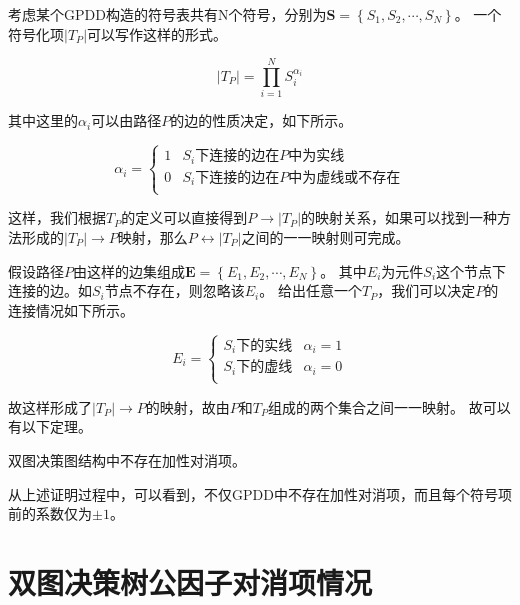 考虑某个GPDD构造的符号表共有N个符号，分别为${\mathbf{S}} = \left\{ {{S_1},{S_2}, \cdots ,{S_N}} \right\}$。
一个符号化项$\left|T_P\right|$可以写作这样的形式。

\begin{equation}
\left| {{T_P}} \right| = \prod\limits_{i = 1}^N {S_i^{{\alpha _i}}}
\end{equation}

其中这里的$\alpha _i$可以由路径$P$的边的性质决定，如下所示。

\begin{equation}
{\alpha _i} = \left\{ {
	\begin{array}{*{20}{c}}
	1 & {{S_i}{\text{下连接的边在}P\text{中为实线}}}  \\
	0 & {{S_i}{\text{下连接的边在}P\text{中为虚线或不存在}}}  \\
	\end{array} } \right.
\end{equation}

这样，我们根据$T_P$的定义可以直接得到$P \rightarrow \left|T_P\right|$的映射关系，如果可以找到一种方法形成的$\left|T_P\right| \rightarrow P$映射，那么$P \leftrightarrow \left|T_P\right|$之间的一一映射则可完成。

假设路径$P$由这样的边集组成${\mathbf{E}} = \left\{ {{E_1},{E_2}, \cdots ,{E_N}} \right\}$。
其中$E_i$为元件$S_i$这个节点下连接的边。如$S_i$节点不存在，则忽略该$E_i$。
给出任意一个$T_P$，我们可以决定$P$的连接情况如下所示。

\begin{equation}
{E_i} = \left\{ {
	\begin{array}{*{20}{c}}
	{{S_i}{\text{下的实线}}} & {{\alpha _i} = 1}  \\
	{{S_i}{\text{下的虚线}}} & {{\alpha _i} = 0}  \\
	\end{array} } \right.
\end{equation}

故这样形成了$\left|T_P\right| \rightarrow P$的映射，故由$P$和$T_P$组成的两个集合之间一一映射。
故可以有以下定理。

\begin{thm}
	双图决策图结构中不存在加性对消项。
\end{thm}

从上述证明过程中，可以看到，不仅GPDD中不存在加性对消项，而且每个符号项前的系数仅为$\pm1$。

\section{双图决策树公因子对消项情况}
\label{sec:cancel:factor}

